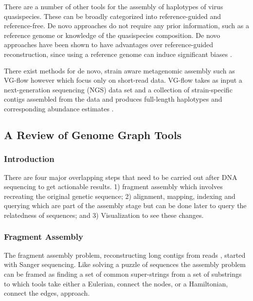 \documentclass[11pt]{article}
\begin{document}
There are a number of other tools for the assembly of haplotypes of virus
quasispecies.
These can be broadly categorized into reference-guided and reference-free.
De novo approaches do not require any prior information, such as a reference
genome or knowledge of the quasispecies composition. De novo approaches have
been shown to have advantages over reference-guided reconstruction, since using
a reference genome can induce significant biases
\cite{baaijensStrainawareAssemblyGenomes2020}.

There exist methods for de novo, strain aware metagenomic assembly such as 
VG-flow \cite{baaijensStrainawareAssemblyGenomes2020} however which focus only on 
short-read data.
VG-flow takes as input a next-generation sequencing (NGS) data set and a 
collection of strain-specific contigs assembled from the data and produces 
full-length haplotypes and corresponding abundance estimates 
\cite{baaijensStrainawareAssemblyGenomes2020}.
\subsection{A Review of Genome Graph Tools}
\label{sec:org81d10bd}
\subsubsection{Introduction}
\label{sec:orgb537c57}

There are four major overlapping steps that need to be carried out after DNA 
sequencing to get actionable results. 1) fragment assembly which involves 
recreating the original genetic sequence; 2) alignment, mapping, indexing and 
querying which are part of the assembly stage but can be done later to query the
relatedness of sequences; and 3) Visualization to see these changes.\cite{flicekSenseSequenceReads2009}

\subsubsection{Fragment Assembly}
\label{sec:org750d50f}
The fragment assembly problem, reconstructing long contigs from reads
\cite{chikhiCompactingBruijnGraphs2016}, started with Sanger sequencing.
Like solving a puzzle of sequences the assembly problem can be framed as finding
a set of common super-strings from a set of substrings to which tools take 
either a Eulerian, connect the nodes, or a Hamiltonian, connect the edges, 
approach.
\end{document}
